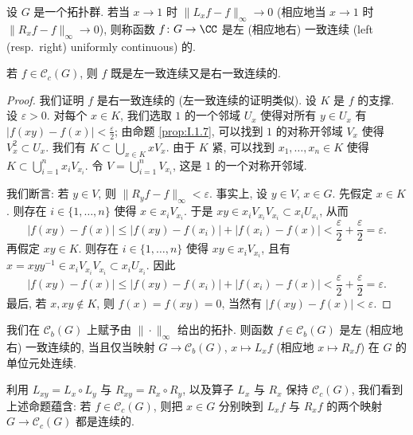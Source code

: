\begin{definition}
\label{def:I.1.11}
设 $G$ 是一个拓扑群. 若当 $x \to 1$ 时 $\|L_xf - f\|_{\infty} \to 0$ (相应地当 $x \to 1$ 时 $\|R_xf - f\|_{\infty} \to 0$), 则称函数 $f \colon G \to \CC$ 是左 (相应地右) 一致连续 (left (resp.\ right) uniformly continuous) 的.
\end{definition}

\begin{proposition}[紧支撑函数的均匀连续性]
\label{prop:I.1.12}
若 $f \in \mathcal{C}_c(G)$, 则 $f$ 既是左一致连续又是右一致连续的.
\end{proposition}

\begin{proof}
我们证明 $f$ 是右一致连续的 (左一致连续的证明类似). 设 $K$ 是 $f$ 的支撑. 设 $\varepsilon > 0$. 对每个 $x \in K$, 我们选取 $1$ 的一个邻域 $U_x$ 使得对所有 $y \in U_x$ 有 $|f(xy) - f(x)| < \frac{\varepsilon}{2}$; 由命题 \ref{prop:I.1.7}, 可以找到 $1$ 的对称开邻域 $V_x$ 使得 $V_x^2 \subset U_x$. 我们有 $K \subset \bigcup_{x \in K} xV_x$. 由于 $K$ 紧, 可以找到 $x_1, \ldots, x_n \in K$ 使得 $K \subset \bigcup_{i=1}^n x_iV_{x_i}$. 令 $V = \bigcup_{i=1}^n V_{x_i}$, 这是 $1$ 的一个对称开邻域.

我们断言: 若 $y \in V$, 则 $\|R_yf - f\|_{\infty} < \varepsilon$. 事实上, 设 $y \in V$, $x \in G$. 先假定 $x \in K$. 则存在 $i \in \{1, \ldots, n\}$ 使得 $x \in x_iV_{x_i}$. 于是 $xy \in x_iV_{x_i}V_{x_i} \subset x_iU_{x_i}$, 从而
\[
|f(xy) - f(x)| \leq |f(xy) - f(x_i)| + |f(x_i) - f(x)| < \frac{\varepsilon}{2} + \frac{\varepsilon}{2} = \varepsilon.
\]
再假定 $xy \in K$. 则存在 $i \in \{1, \ldots, n\}$ 使得 $xy \in x_iV_{x_i}$, 且有 $x = xyy^{-1} \in x_iV_{x_i}V_{x_i} \subset x_iU_{x_i}$. 因此
\[
|f(xy) - f(x)| \leq |f(xy) - f(x_i)| + |f(x_i) - f(x)| < \frac{\varepsilon}{2} + \frac{\varepsilon}{2} = \varepsilon.
\]
最后, 若 $x, xy \notin K$, 则 $f(x) = f(xy) = 0$, 当然有 $|f(xy) - f(x)| < \varepsilon$.
\end{proof}

\begin{remark}[一致连续与连续性的等价刻画]
\label{rem:I.1.13}
我们在 $\mathcal{C}_b(G)$ 上赋予由 $\|\cdot\|_{\infty}$ 给出的拓扑. 则函数 $f \in \mathcal{C}_b(G)$ 是左 (相应地右) 一致连续的, 当且仅当映射 $G \to \mathcal{C}_b(G)$, $x \longmapsto L_xf$ (相应地 $x \longmapsto R_xf$) 在 $G$ 的单位元处连续.

利用 $L_{xy} = L_x \circ L_y$ 与 $R_{xy} = R_x \circ R_y$, 以及算子 $L_x$ 与 $R_x$ 保持 $\mathcal{C}_c(G)$, 我们看到上述命题蕴含: 若 $f \in \mathcal{C}_c(G)$, 则把 $x \in G$ 分别映到 $L_xf$ 与 $R_xf$ 的两个映射 $G \to \mathcal{C}_c(G)$ 都是连续的.
\end{remark}

